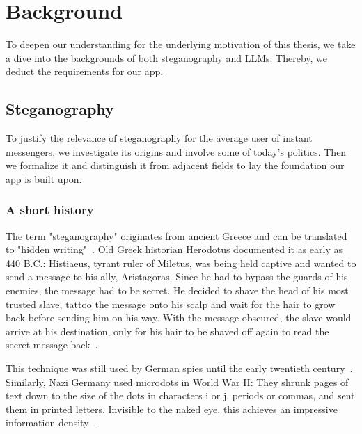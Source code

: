
\chapter{Background}\label{ch:background}
\glsresetall %

To deepen our understanding for the underlying motivation of this thesis, we take a dive into the backgrounds of both steganography and \glspl{LLM}. Thereby, we deduct the requirements for our app.

\section{Steganography}
\label{sec:steganography}
To justify the relevance of steganography for the average user of instant messengers, we investigate its origins and involve some of today's politics. Then we formalize it and distinguish it from adjacent fields to lay the foundation our app is built upon.

\subsection{A short history}
\label{sec:aShortHistory}
The term "steganography" originates from ancient Greece and can be translated to "hidden writing"~\cite{kolataVeiledMessagesTerror2001,dembartEndUserHide2001}. Old Greek historian Herodotus documented it as early as 440 B.C.: Histiaeus, tyrant ruler of Miletus, was being held captive and wanted to send a message to his ally, Aristagoras. Since he had to bypass the guards of his enemies, the message had to be secret. He decided to shave the head of his most trusted slave, tattoo the message onto his scalp and wait for the hair to grow back before sending him on his way. With the message obscured, the slave would arrive at his destination, only for his hair to be shaved off again to read the secret message back~\cite{bennettLinguisticSteganographySurvey2004,petitcolasInformationHidingSurvey1999,dembartEndUserHide2001}.

This technique was still used by German spies until the early twentieth century~\cite{petitcolasInformationHidingSurvey1999}. Similarly, Nazi Germany used microdots in World War II: They shrunk pages of text down to the size of the dots in characters i or j, periods or commas, and sent them in printed letters. Invisible to the naked eye, this achieves an impressive information density~\cite{dembartEndUserHide2001,petitcolasInformationHidingSurvey1999}.

